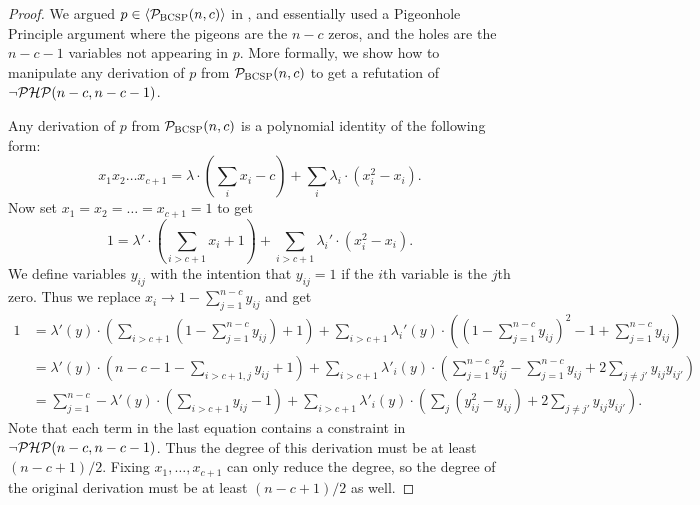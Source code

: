 \begin{proof}
We argued $p \in \langle \mathcal P_{\textsc{BCSP}}(n,c) \rangle$ in , and essentially used a Pigeonhole Principle argument where the pigeons are the $n-c$ zeros, and the holes are the $n-c-1$ variables not appearing in $p$.
More formally, we show how to manipulate any derivation of $p$ from $\mathcal P_{\textsc{BCSP}}(n,c)$ to get a refutation of $\neg\mathcal P\mathcal H\mathcal P(n-c,n-c-1)$.

Any derivation of $p$ from $\mathcal P_{\textsc{BCSP}}(n,c)$ is a polynomial identity of the following form:
\[x_1x_2\dots x_{c+1} = \lambda \cdot \left(\sum_i x_i - c\right) + \sum_i \lambda_i \cdot (x_i^2 - x_i).\]
Now set $x_1 = x_2 = \dots = x_{c+1} = 1$ to get
\[1 = \lambda' \cdot \left(\sum_{i > c+1} x_i + 1\right) + \sum_{i > c+1} \lambda_i' \cdot (x_i^2 - x_i).\]
We define variables $y_{ij}$ with the intention that $y_{ij} = 1$ if the $i$th variable is the $j$th zero. Thus we replace $x_i \rightarrow 1 - \sum_{j=1}^{n-c} y_{ij}$ and get
\begin{align*}
1 &= \lambda'(y) \cdot \left(\sum_{i > c+1} \left(1 - \sum_{j=1}^{n-c} y_{ij}\right) + 1\right) + \sum_{i > c+1} \lambda_i'(y) \cdot \left( \left(1 - \sum_{j=1}^{n-c} y_{ij}\right)^2 - 1 + \sum_{j=1}^{n-c} y_{ij}\right) \\
&= \lambda'(y) \cdot \left(n-c-1 - \sum_{i> c+1, j} y_{ij} + 1\right) + \sum_{i > c+1} \lambda'_i(y) \cdot \left(\sum_{j=1}^{n-c} y_{ij}^2 - \sum_{j=1}^{n-c} y_{ij} + 2\sum_{j\neq j'} y_{ij}y_{ij'}\right) \\
&= \sum_{j=1}^{n-c} -\lambda'(y)\cdot\left(\sum_{i > c+1} y_{ij} - 1\right) + \sum_{i > c+1} \lambda'_i(y) \cdot \left(\sum_j \left(y_{ij}^2 - y_{ij}\right) + 2\sum_{j\neq j'} y_{ij}y_{ij'}\right).
\end{align*}
Note that each term in the last equation contains a constraint in $\neg\mathcal P\mathcal H\mathcal P(n-c,n-c-1)$. Thus the degree of this derivation must be at least $(n-c+1)/2$. Fixing $x_1, \dots, x_{c+1}$ can only reduce the degree, so the degree of the original derivation must be at least $(n-c+1)/2$ as well. 
\end{proof}

